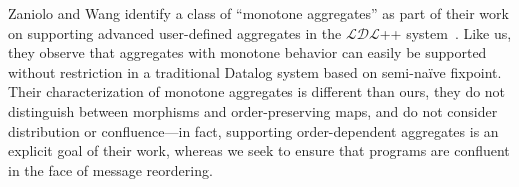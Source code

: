 Zaniolo and Wang identify a class of ``monotone aggregates'' as part of their
work on supporting advanced user-defined aggregates in the $\mathcal{LDL}$++
system~\cite{Zaniolo1999}. Like us, they observe that aggregates with monotone
behavior can easily be supported without restriction in a traditional Datalog
system based on semi-na\"{i}ve fixpoint. Their characterization of monotone
aggregates is different than ours, they do not distinguish between morphisms and
order-preserving maps, and do not consider distribution or confluence---in fact,
supporting order-dependent aggregates is an explicit goal of their work, whereas
we seek to ensure that programs are confluent in the face of message reordering.
